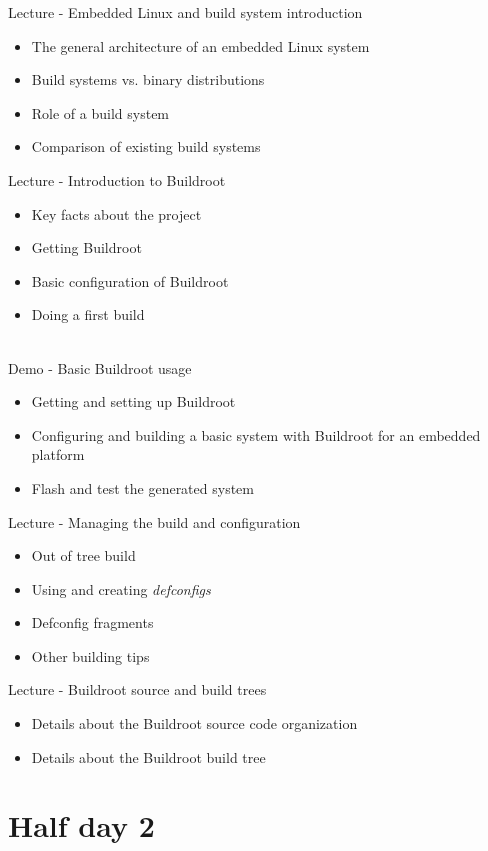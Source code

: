 \documentclass[a4paper,12pt,obeyspaces,spaces,hyphens]{article}
\begin{document}
\feagendatwocolumn
{Lecture - Embedded Linux and build system introduction}
{
  \begin{itemize}
  \item The general architecture of an embedded Linux system
  \item Build systems vs. binary distributions
  \item Role of a build system
  \item Comparison of existing build systems
  \end{itemize}
}
{Lecture - Introduction to Buildroot}
{
  \begin{itemize}
  \item Key facts about the project
  \item Getting Buildroot
  \item Basic configuration of Buildroot
  \item Doing a first build
  \end{itemize}
}
\\
\feagendatwocolumn
{Demo - Basic Buildroot usage}
{
  \begin{itemize}
  \item Getting and setting up Buildroot
  \item Configuring and building a basic system with Buildroot for an
    embedded platform
  \item Flash and test the generated system
  \end{itemize}
}
{Lecture - Managing the build and configuration}
{
  \begin{itemize}
  \item Out of tree build
  \item Using and creating {\em defconfigs}
  \item Defconfig fragments
  \item Other building tips
  \end{itemize}
}

\feagendaonecolumn
{Lecture - Buildroot source and build trees}
{
  \begin{itemize}
  \item Details about the Buildroot source code organization
  \item Details about the Buildroot build tree
  \end{itemize}
}


\section{Half day 2}
\end{document}
